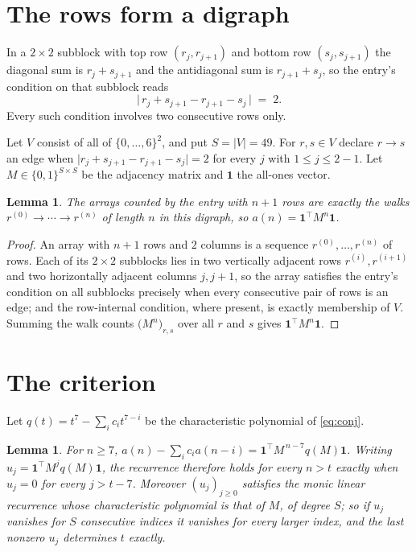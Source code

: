 \documentclass[11pt,a4paper]{article}
\theoremstyle{plain}
\newtheorem{lemma}[theorem]{Lemma}
\theoremstyle{definition}
\begin{document}
\section{The rows form a digraph}

In a $2\times2$ subblock with top row $(r_j,r_{j+1})$ and bottom row $(s_j,s_{j+1})$ the
diagonal sum is $r_j+s_{j+1}$ and the antidiagonal sum is $r_{j+1}+s_j$, so the entry's
condition on that subblock reads
\[
\bigl|\,r_j+s_{j+1}-r_{j+1}-s_j\,\bigr|\;=\;2.
\]
Every such condition involves two consecutive rows only.

Let $V$ consist of all of $\{0,\dots,6\}^{2}$, and put $S=|V|=49$. For $r,s\in V$ declare $r\to s$ an edge
when $\bigl|r_j+s_{j+1}-r_{j+1}-s_j\bigr|=2$ for every $j$ with
$1\le j\le2-1$. Let $M\in\{0,1\}^{S\times S}$ be the adjacency matrix and $\mathbf{1}$
the all-ones vector.

\begin{lemma}\label{lem:walk}
The arrays counted by the entry with $n+1$ rows are exactly the walks
$r^{(0)}\to\cdots\to r^{(n)}$ of length $n$ in this digraph, so
$a(n)=\mathbf{1}^{\!\top}M^{n}\mathbf{1}$.
\end{lemma}

\begin{proof}
An array with $n+1$ rows and $2$ columns is a sequence $r^{(0)},\dots,r^{(n)}$ of
rows. Each of its $2\times2$ subblocks lies in two vertically adjacent rows
$r^{(i)},r^{(i+1)}$ and two horizontally adjacent columns $j,j+1$, so the array satisfies
the entry's condition on all subblocks precisely when every consecutive pair of rows is an
edge; and the row-internal condition, where present, is exactly membership of $V$. Summing
the walk counts $\bigl(M^{n}\bigr)_{r,s}$ over all $r$ and $s$ gives
$\mathbf{1}^{\!\top}M^{n}\mathbf{1}$.
\end{proof}

\section{The criterion}

Let $q(t)=t^{7}-\sum_i c_i t^{7-i}$ be the characteristic polynomial of
\eqref{eq:conj}.

\begin{lemma}\label{lem:crit}
For $n\ge7$,
$a(n)-\sum_i c_i a(n-i)=\mathbf{1}^{\!\top}M^{\,n-7}q(M)\mathbf{1}$. Writing
$u_j=\mathbf{1}^{\!\top}M^{j}q(M)\mathbf{1}$, the recurrence therefore holds for every
$n>t$ exactly when $u_j=0$ for every $j>t-7$. Moreover $(u_j)_{j\ge0}$ satisfies the
monic linear recurrence whose characteristic polynomial is that of $M$, of degree $S$; so
if $u_j$ vanishes for $S$ consecutive indices it vanishes for every larger index, and the
last nonzero $u_j$ determines $t$ exactly.
\end{lemma}
\end{document}
